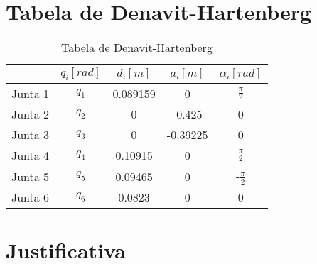  


\section{Tabela de Denavit-Hartenberg}


\begin{table}[ht]
\centering
\begin{tabular}[t]{lcccc}
\toprule
 &$q_i [rad]$ &$d_i [m]$ &$a_i [m]$ &$\alpha_i [rad]$\\
\midrule
Junta 1& $q_1$& 0.089159&0&$\frac{\pi}{2}$\\
Junta 2& $q_2$& 0 &-0.425&0\\
Junta 3& $q_3$& 0 &-0.39225&0\\
Junta 4& $q_4$& 0.10915 &0&$\frac{\pi}{2}$\\
Junta 5& $q_5$& 0.09465 &0&-$\frac{\pi}{2}$\\
Junta 6& $q_6$& 0.0823 &0&0\\
\bottomrule
\end{tabular}
\caption{Tabela de Denavit-Hartenberg}
\end{table}%

\section{Justificativa}
